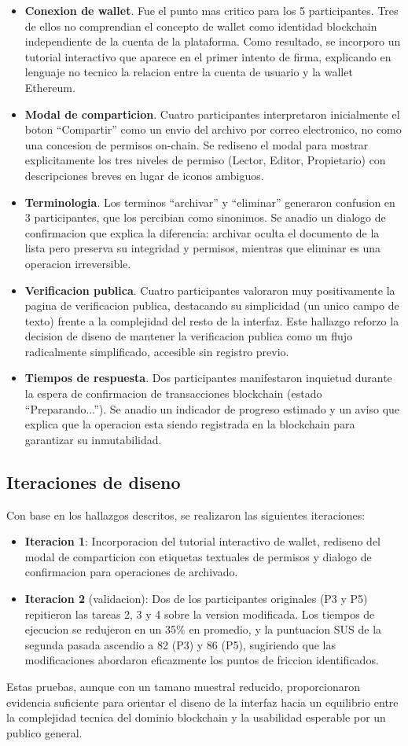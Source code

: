 \documentclass[11pt, a4paper]{article}
\begin{document}
\begin{itemize}
    \item \textbf{Conexion de wallet}. Fue el punto mas critico para los 5 participantes. Tres de ellos no comprendian el concepto de wallet como identidad blockchain independiente de la cuenta de la plataforma. Como resultado, se incorporo un tutorial interactivo que aparece en el primer intento de firma, explicando en lenguaje no tecnico la relacion entre la cuenta de usuario y la wallet Ethereum.
    \item \textbf{Modal de comparticion}. Cuatro participantes interpretaron inicialmente el boton ``Compartir'' como un envio del archivo por correo electronico, no como una concesion de permisos on-chain. Se rediseno el modal para mostrar explicitamente los tres niveles de permiso (Lector, Editor, Propietario) con descripciones breves en lugar de iconos ambiguos.
    \item \textbf{Terminologia}. Los terminos ``archivar'' y ``eliminar'' generaron confusion en 3 participantes, que los percibian como sinonimos. Se anadio un dialogo de confirmacion que explica la diferencia: archivar oculta el documento de la lista pero preserva su integridad y permisos, mientras que eliminar es una operacion irreversible.
    \item \textbf{Verificacion publica}. Cuatro participantes valoraron muy positivamente la pagina de verificacion publica, destacando su simplicidad (un unico campo de texto) frente a la complejidad del resto de la interfaz. Este hallazgo reforzo la decision de diseno de mantener la verificacion publica como un flujo radicalmente simplificado, accesible sin registro previo.
    \item \textbf{Tiempos de respuesta}. Dos participantes manifestaron inquietud durante la espera de confirmacion de transacciones blockchain (estado ``Preparando...''). Se anadio un indicador de progreso estimado y un aviso que explica que la operacion esta siendo registrada en la blockchain para garantizar su inmutabilidad.
\end{itemize}

\subsection{Iteraciones de diseno}

Con base en los hallazgos descritos, se realizaron las siguientes iteraciones:

\begin{itemize}
    \item \textbf{Iteracion 1}: Incorporacion del tutorial interactivo de wallet, rediseno del modal de comparticion con etiquetas textuales de permisos y dialogo de confirmacion para operaciones de archivado.
    \item \textbf{Iteracion 2} (validacion): Dos de los participantes originales (P3 y P5) repitieron las tareas 2, 3 y 4 sobre la version modificada. Los tiempos de ejecucion se redujeron en un 35\% en promedio, y la puntuacion SUS de la segunda pasada ascendio a 82 (P3) y 86 (P5), sugiriendo que las modificaciones abordaron eficazmente los puntos de friccion identificados.
\end{itemize}

Estas pruebas, aunque con un tamano muestral reducido, proporcionaron evidencia suficiente para orientar el diseno de la interfaz hacia un equilibrio entre la complejidad tecnica del dominio blockchain y la usabilidad esperable por un publico general.
\end{document}
